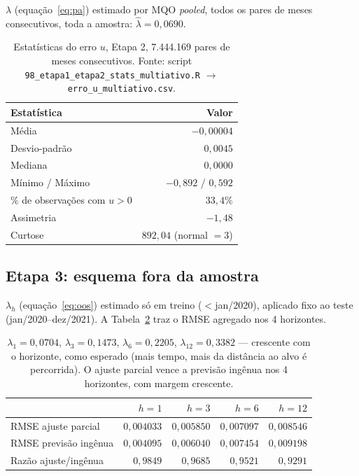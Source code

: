 \documentclass[11pt,a4paper]{article}
\begin{document}
$\lambda$ (equação~\eqref{eq:pa}) estimado por MQO \emph{pooled}, todos os pares de meses
consecutivos, toda a amostra: $\widehat\lambda = 0{,}0690$.

\begin{table}[h]\centering\small
\caption{Estatísticas do erro $u$, Etapa 2, 7.444.169 pares de meses consecutivos. Fonte: script
\texttt{98\_etapa1\_etapa2\_stats\_multiativo.R} $\to$ \texttt{erro\_u\_multiativo.csv}.}
\label{tab:erro-u}
\begin{tabular}{@{}lr@{}}
\toprule
Estatística & Valor \\
\midrule
Média & $-0{,}00004$ \\
Desvio-padrão & $0{,}0045$ \\
Mediana & $0{,}0000$ \\
Mínimo / Máximo & $-0{,}892$ / $0{,}592$ \\
\% de observações com $u>0$ & $33{,}4\%$ \\
Assimetria & $-1{,}48$ \\
Curtose & $892{,}04$ (normal $=3$) \\
\bottomrule
\end{tabular}
\end{table}

\FloatBarrier
\subsection{Etapa 3: esquema fora da amostra}

$\lambda_h$ (equação~\eqref{eq:oos}) estimado só em treino ($<$jan/2020), aplicado fixo ao teste
(jan/2020--dez/2021). A Tabela~\ref{tab:oos-agregado} traz o RMSE agregado nos 4 horizontes.

\begin{table}[h]\centering\small
\caption{RMSE fora da amostra, ajuste parcial vs.\ previsão ingênua, 4 horizontes. Fonte: script
\texttt{99\_pipeline\_hhi\_lag\_etapa1.R}.}
\label{tab:oos-agregado}
\begin{tabular}{@{}lrrrr@{}}
\toprule
& $h=1$ & $h=3$ & $h=6$ & $h=12$ \\
\midrule
RMSE ajuste parcial & $0{,}004033$ & $0{,}005850$ & $0{,}007097$ & $0{,}008546$ \\
RMSE previsão ingênua & $0{,}004095$ & $0{,}006040$ & $0{,}007454$ & $0{,}009198$ \\
Razão ajuste/ingênua & $0{,}9849$ & $0{,}9685$ & $0{,}9521$ & $0{,}9291$ \\
\bottomrule
\end{tabular}
\caption*{\footnotesize $\lambda_1=0{,}0704$, $\lambda_3=0{,}1473$, $\lambda_6=0{,}2205$,
$\lambda_{12}=0{,}3382$ --- crescente com o horizonte, como esperado (mais tempo, mais da
distância ao alvo é percorrida). O ajuste parcial vence a previsão ingênua nos 4 horizontes, com
margem crescente.}
\end{table}
\end{document}
